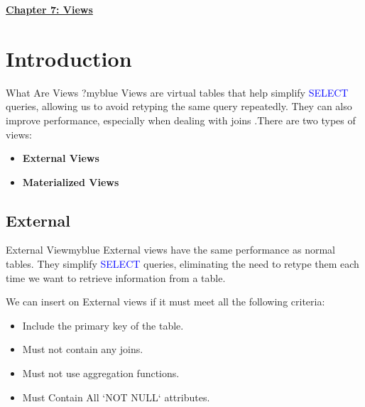 \newpage 
\null 
\vspace{0.15cm}

\begin{center} 
\Huge{\textbf{\underline{Chapter 7: Views}}}
\end{center}

\vspace{0.25cm}

\setcounter{section}{0}

\vspace{1cm}


\section{Introduction}
\begin{prettyBox}{What Are Views ?}{myblue}
    Views are virtual tables that help simplify \textcolor{blue}{SELECT} queries, allowing us to avoid retyping the same query repeatedly. They can also improve performance, especially when dealing with joins .There are two types of views:  
\begin{itemize}
    \item \textbf{External Views} 
    \item \textbf{Materialized Views}
\end{itemize}
\end{prettyBox}




\subsection{External}


\begin{prettyBox}{External View}{myblue}
    External views have the same performance as normal tables. They simplify \textcolor{blue}{SELECT} queries, eliminating the need to retype them each time we want to retrieve information from a table. 

\vspace{0.15cm}
We can insert on External views if it must meet all the following criteria:  
\begin{itemize}
    \item Include the primary key of the table.
    \item Must not contain any joins.
    \item Must not use aggregation functions.
    \item Must Contain All `NOT NULL` attributes.
\end{itemize}
\end{prettyBox}


